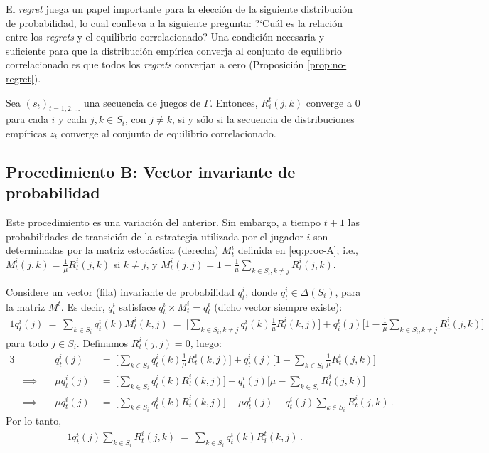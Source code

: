 El \textit{regret} juega un papel importante para la elección de la siguiente distribución de probabilidad, lo cual conlleva a la siguiente pregunta: ?`Cuál es la relación entre los \textit{regrets} y el equilibrio correlacionado? Una condición necesaria y suficiente para que la distribución empírica converja al conjunto de equilibrio correlacionado es que todos los \textit{regrets} converjan a cero (Proposición \ref{prop:no-regret}).

\begin{theorem}
\label{prop:no-regret}
Sea $(s_t)_{t = 1, 2, ...}$ una secuencia de juegos de $\Gamma$.
Entonces, $R_i^t(j, k)$ converge a $0$ para cada $i$ y cada $j, k \in S_i$, con $j \neq k$, si y sólo si la secuencia de distribuciones empíricas $z_t$ converge al conjunto de equilibrio correlacionado.
\end{theorem}


\subsection*{Procedimiento B: Vector invariante de probabilidad}

Este procedimiento es una variación del anterior. Sin embargo, a tiempo $t+1$ las probabilidades de transición de la estrategia utilizada por el jugador $i$ son determinadas por la matriz estocástica (derecha) $M^i_t$ definida en \eqref{eq:proc-A}; i.e., $M^i_t(j,k)=\frac{1}{\mu}R^i_t(j,k)$ si $k\neq j$, y $M^i_t(j,j)=1-\frac{1}{\mu}\sum_{k\in S_i,k\neq j} R^i_t(j,k)$.

Considere un vector (fila) invariante de probabilidad $q^i_t$, donde $q^i_t\in \Delta(S_i)$, para la matriz $M^t$. Es decir, $q^i_t$ satisface $q^i_t \times M^i_t = q^i_t$ (dicho vector siempre existe):
\begin{alignat}{1}
  q^i_t(j)\ 
    =\ \sum_{k\in S_i} q^i_t(k) M^i_t(k,j)\ 
    =\ \bigg[\sum_{k \in S_i, k \neq j} q^i_t(k)\frac{1}{\mu}R^i_t(k,j)\bigg] + q_i^t(j)\biggl[1 - \frac{1}{\mu}\sum_{k \in S_i, k \neq j} R^i_t(j,k)\biggr]
\end{alignat}
para todo $j \in S_i$. Definamos $R_t^i(j, j) = 0$, luego:
\begin{alignat}{3}
  &
  & q^i_t(j)\ &=\ \biggl[\sum_{k \in S_i} q^i_t(k)\frac{1}{\mu}R^i_t(k,j)\biggr] + q^i_t(j)\biggl[1 - \sum_{k \in S_i} \frac{1}{\mu} R^i_t(j,k)\biggr] \\
  &\implies\quad
  &\mu q_t^i(j)\ &=\ \biggl[\sum_{k \in S_i}q^i_t(k)R^i_t(k,j)\biggr] + q^i_t(j)\biggl[\mu - \sum_{k \in S_i} R^i_t(j, k)\biggr] \\
  &\implies\quad
  &\mu q^i_t(j)\ & =\ \biggl[\sum_{k \in S_i}q^i_t(k)R^i_t(k,j)\biggr] + \mu q^i_t(j) - q^i_t(j)\sum_{k\in S_i} R^i_t(j,k) \,.
\end{alignat}
Por lo tanto,
\begin{alignat}{1}
\label{eq:proc-B}
q^i_t(j)\sum_{k \in S_i} R^i_t(j,k)\ =\ \sum_{k \in S_i} q_t^i(k)R_i^t(k,j) \,.
\end{alignat}

